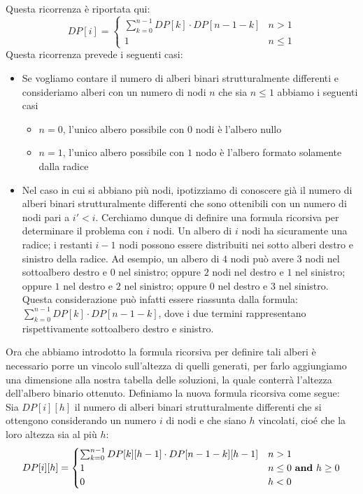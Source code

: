 \documentclass[../cheatSheetAlgoritmi.tex]{subfiles}
\begin{document}
Questa ricorrenza è riportata qui: 
\begin{equation*}
  	DP[i] =\begin{cases}
    	\sum_{k = 0}^{n - 1} DP[k] \cdot DP[n - 1 - k] & \text{$n > 1$}\\
    	1 & \text{$n \leq 1$}
  	\end{cases}
\end{equation*}
Questa ricorrenza prevede i seguenti casi: 
\begin{itemize}
	\item Se vogliamo contare il numero di alberi binari strutturalmente differenti e consideriamo alberi con un numero di nodi $n$ che sia $n\leq 1$ abbiamo i seguenti casi
	\begin{itemize}
		\item $n = 0$, l'unico albero possibile con $0$ nodi è l'albero nullo
		\item $n = 1$, l'unico albero possibile con $1$ nodo è l'albero formato solamente dalla radice
	\end{itemize}
	\item Nel caso in cui si abbiano più nodi, ipotizziamo di conoscere già il numero di alberi binari strutturalmente differenti che sono ottenibili con un numero di nodi pari a $i' < i$. Cerchiamo dunque di definire una formula ricorsiva per determinare il problema con $i$ nodi.  Un albero di $i$ nodi ha sicuramente una radice; i restanti $i-1$ nodi possono essere distribuiti nei sotto alberi destro e sinistro della radice. Ad esempio, un albero di $4$ nodi può avere $3$ nodi nel sottoalbero destro e $0$ nel sinistro; oppure $2$ nodi nel destro e $1$ nel sinistro; oppure $1$ nel destro e $2$ nel sinistro; oppure $0$ nel destro e $3$ nel sinistro. Questa considerazione può infatti essere riassunta dalla formula: $\sum_{k = 0}^{n - 1} DP[k] \cdot DP[n - 1 - k]$, dove i due termini rappresentano rispettivamente sottoalbero destro e sinistro.
\end{itemize}
Ora che abbiamo introdotto la formula ricorsiva per definire tali alberi è necessario porre un vincolo sull'altezza di quelli generati, per farlo aggiungiamo una dimensione alla nostra tabella delle soluzioni, la quale conterrà l'altezza dell'albero binario ottenuto. Definiamo la nuova formula ricorsiva come segue: \\
Sia $DP[i][h]$ il numero di alberi binari strutturalmente differenti che si ottengono considerando un numero $i$ di nodi e che siano $h$ vincolati, cioé che la loro altezza sia al più $h$: 
\begin{equation*}
  	DP[i][h] =\begin{cases}
    	\sum_{k = 0}^{n - 1} DP[k][h - 1] \cdot DP[n - 1 - k][h - 1] & \text{$n > 1$}\\
    	1 & \text{$n \leq 0$ \textbf{and} $h \geq 0$} \\
    	0 & \text{$h < 0$}
  	\end{cases}
\end{equation*}
\end{document}
